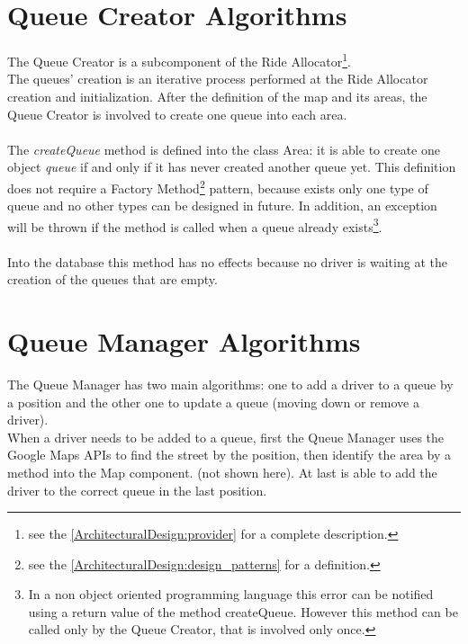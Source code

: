 \documentclass[\mainpath/main]{subfiles}
\begin{document}
\section{Queue Creator Algorithms}
\label{AlgorithmDesign:QueueCreatorAlgorithms}

The Queue Creator is a subcomponent of the Ride Allocator\footnote{see the \autoref{ArchitecturalDesign:provider} for a complete description.}.\\
The queues' creation is an iterative process performed at the Ride Allocator creation and initialization. After the definition of the map and its areas, the Queue Creator is involved to create one queue into each area.\\

\\[0.5cm]

The \textit{createQueue} method is defined into the class Area: it is able to create one object \textit{queue} if and only if it has never created another queue yet. This definition does not require a Factory Method\footnote{see the \autoref{ArchitecturalDesign:design_patterns} for a definition.} pattern, because exists only one type of queue and no other types can be designed in future. In addition, an exception will be thrown if the method is called when a queue already exists\footnote{In a non object oriented programming language this error can be notified using a return value of the method createQueue. However this method can be called only by the Queue Creator, that is involved only once.}.\\
\\
Into the database this method has no effects because no driver is waiting at the creation of the queues that are empty.

\section{Queue Manager Algorithms}
\label{AlgorithmDesign:QueueManagerAlgorithms}

The Queue Manager has two main algorithms: one to add a driver to a queue by a position and the other one to update a queue (moving down or remove a driver).\\
When a driver needs to be added to a queue, first the Queue Manager uses the Google Maps APIs to find the street by the position, then identify the area by a method into the Map component. (not shown here). At last is able to add the driver to the correct queue in the last position.\\
\end{document}
